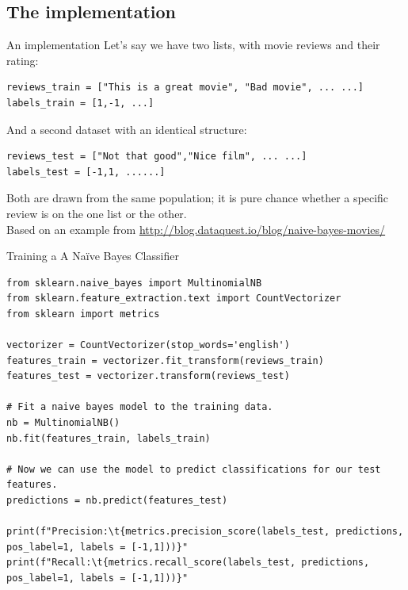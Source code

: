 \documentclass[compress]{beamer}
\begin{document}
 
\subsection{The implementation}

\begin{frame}[fragile]{An implementation}
Let's say we have two lists, with movie reviews and their rating:
\begin{lstlisting}
reviews_train = ["This is a great movie", "Bad movie", ... ...]
labels_train = [1,-1, ...]  
\end{lstlisting}
And a second dataset with an identical structure:
\begin{lstlisting}
reviews_test = ["Not that good","Nice film", ... ...]
labels_test = [-1,1, ......]
\end{lstlisting}
Both are drawn from the same population; it is pure chance whether a specific review is on the one list or the other.\\
\tiny{Based on an example from \url{http://blog.dataquest.io/blog/naive-bayes-movies/}}
\end{frame}

\begin{frame}[fragile]{Training a A Naïve Bayes Classifier}
  \begin{lstlisting}
from sklearn.naive_bayes import MultinomialNB
from sklearn.feature_extraction.text import CountVectorizer
from sklearn import metrics

vectorizer = CountVectorizer(stop_words='english')
features_train = vectorizer.fit_transform(reviews_train)
features_test = vectorizer.transform(reviews_test)

# Fit a naive bayes model to the training data.
nb = MultinomialNB()
nb.fit(features_train, labels_train)

# Now we can use the model to predict classifications for our test features.
predictions = nb.predict(features_test)

print(f"Precision:\t{metrics.precision_score(labels_test, predictions, pos_label=1, labels = [-1,1]))}"
print(f"Recall:\t{metrics.recall_score(labels_test, predictions, pos_label=1, labels = [-1,1]))}"
\end{lstlisting}
\end{frame}
%
\end{document}
